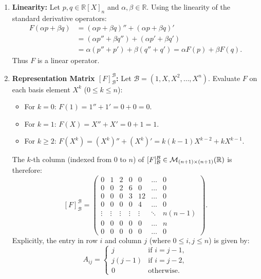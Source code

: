 \begin{exercisesolution}
\label{sol:polynomial_differential_operator_matrix}
\begin{enumerate}[label=\textbf{(\alph*)}]
    \item \textbf{Linearity:}
    Let $p, q \in \mathbb{R}[X]_n$ and $\alpha, \beta \in \mathbb{R}$. Using the linearity of the standard derivative operators:
    \begin{align*}
    F(\alpha p + \beta q) &= (\alpha p + \beta q)'' + (\alpha p + \beta q)' \\
    &= (\alpha p'' + \beta q'') + (\alpha p' + \beta q') \\
    &= \alpha (p'' + p') + \beta (q'' + q') = \alpha F(p) + \beta F(q).
    \end{align*}
    Thus $F$ is a linear operator.

    \item \textbf{Representation Matrix $[F]_{\mathcal{B}}^{\mathcal{B}}$:}
    Let $\mathcal{B} = (1, X, X^2, \dots, X^n)$. Evaluate $F$ on each basis element $X^k$ ($0 \le k \le n$):
    \begin{itemize}
        \item For $k = 0$: $F(1) = 1'' + 1' = 0 + 0 = 0$.
        \item For $k = 1$: $F(X) = X'' + X' = 0 + 1 = 1$.
        \item For $k \ge 2$: $F(X^k) = (X^k)'' + (X^k)' = k(k-1)X^{k-2} + kX^{k-1}$.
    \end{itemize}
    The $k$-th column (indexed from $0$ to $n$) of $[F]_{\mathcal{B}}^{\mathcal{B}} \in \mathcal{M}_{(n+1) \times (n+1)}(\mathbb{R})$ is therefore:
    \[
    [F]_{\mathcal{B}}^{\mathcal{B}} =
    \begin{pmatrix}
    0 & 1 & 2 & 0 & 0 & \dots & 0 \\
    0 & 0 & 2 & 6 & 0 & \dots & 0 \\
    0 & 0 & 0 & 3 & 12 & \dots & 0 \\
    0 & 0 & 0 & 0 & 4 & \dots & 0 \\
    \vdots & \vdots & \vdots & \vdots & \vdots & \ddots & n(n-1) \\
    0 & 0 & 0 & 0 & 0 & \dots & n \\
    0 & 0 & 0 & 0 & 0 & \dots & 0
    \end{pmatrix}.
    \]
    Explicitly, the entry in row $i$ and column $j$ (where $0 \le i, j \le n$) is given by:
    \[
    A_{ij} = \begin{cases}
    j & \text{if } i = j - 1, \\
    j(j-1) & \text{if } i = j - 2, \\
    0 & \text{otherwise.}
    \end{cases}
    \]
\end{enumerate}
\end{exercisesolution}

